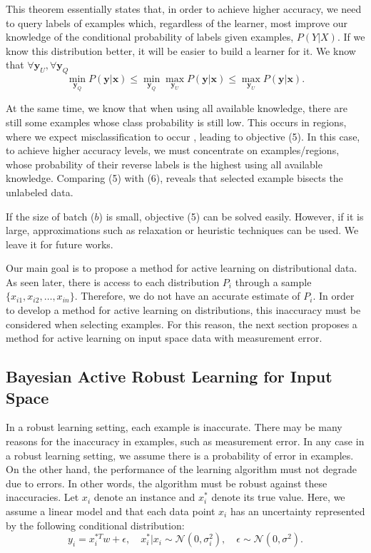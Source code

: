 \documentclass[10pt,twocolumn]{IEEEtran}
\begin{document}
	This theorem essentially states that, in order to achieve higher accuracy, we need to query labels of examples which, regardless of the learner, most improve our knowledge of the conditional probability of labels given examples, $P(Y|X)$. If we know this distribution better, it will be easier to build a learner for it. We know that $\forall \mathbf{y}_U, \forall \mathbf{y}_Q$
	\begin{equation}
		\min_{\mathbf{y}_Q} P(\mathbf{y}|\mathbf{x}) \le \min_{\mathbf{y}_Q} \max_{\mathbf{y}_U} P(\mathbf{y}|\mathbf{x}) \le \max_{\mathbf{y}_U} P(\mathbf{y}|\mathbf{x}).
	\end{equation}
	
	At the same time, we know that when using all available knowledge, there are still some examples whose class probability is still low. This occurs in regions, where we expect misclassification to occur \cite{rasmussen2004gaussian}, leading to objective (5). In this case, to achieve higher accuracy levels, we must concentrate on examples/regions, whose probability of their reverse labels is the highest using all available knowledge. Comparing (5) with (6), reveals that selected example bisects the unlabeled data.
	
	If the size of batch ($b$) is small, objective (5) can be solved easily. However, if it is large, approximations such as relaxation \cite{goemans1995improved} or heuristic techniques can be used. We leave it for future works.
	
	Our main goal is to propose a method for active learning on distributional data. As seen later, there is access to each distribution $P_i$ through a sample $\{x_{i1}, x_{i2}, \ldots, x_{in}\}$. Therefore, we do not have an accurate estimate of $P_i$. In order to develop a method for active learning on distributions, this inaccuracy must be considered when selecting examples. For this reason, the next section proposes a method for active learning on input space data with measurement error.
	
	\subsection{Bayesian Active Robust Learning for Input Space}
	
	In a robust learning setting, each example is inaccurate. There may be many reasons for the inaccuracy in examples, such as measurement error. In any case in a robust learning setting, we assume there is a probability of error in examples. On the other hand, the performance of the learning algorithm must not degrade due to errors. In other words, the algorithm must be robust against these inaccuracies. Let $x_i$ denote an instance and $x_i^*$ denote its true value. Here, we assume a linear model and that each data point $x_i$ has an uncertainty represented by the following conditional distribution:
	\begin{equation}
		y_i = x_i^{*T} w + \epsilon, \quad x_i^*|x_i \sim \mathcal{N}(0, \sigma_i^2), \quad \epsilon \sim \mathcal{N}(0, \sigma^2).
	\end{equation}
	
\end{document}

